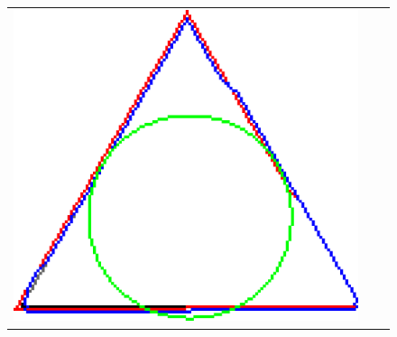 \begin{figure}
\begin{tabular}{ccc}
\includegraphics[scale=0.25]{figures/chapter5/flow/triangle/radius_3/mdca/elastica/len_pen_0.01000/jonctions_1/curve_segs_4/best/gs_0.25000/summary.pdf}\\[2em]


\end{tabular}
\end{figure}
